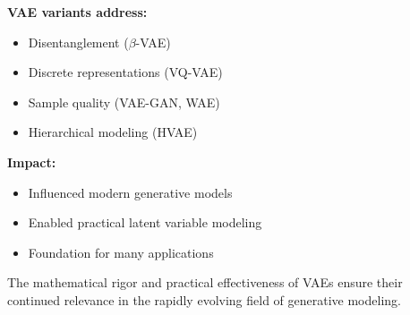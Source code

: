 \textbf{VAE variants address:}
\begin{itemize}
    \item Disentanglement ($\beta$-VAE)
    \item Discrete representations (VQ-VAE)
    \item Sample quality (VAE-GAN, WAE)
    \item Hierarchical modeling (HVAE)
\end{itemize}

\textbf{Impact:}
\begin{itemize}
    \item Influenced modern generative models
    \item Enabled practical latent variable modeling
    \item Foundation for many applications
\end{itemize}

The mathematical rigor and practical effectiveness of VAEs ensure their continued relevance in the rapidly evolving field of generative modeling.
